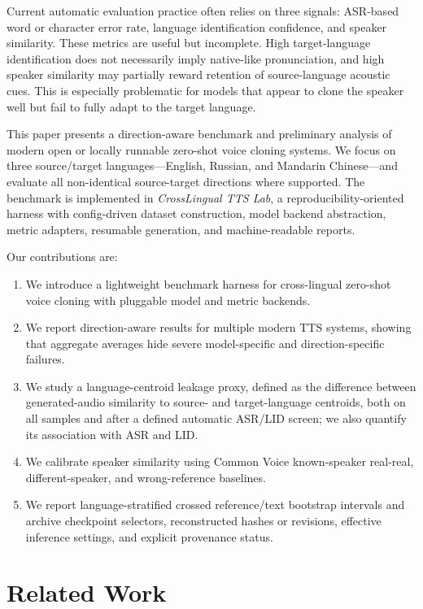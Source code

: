 \documentclass[11pt]{article}
\begin{document}
Current automatic evaluation practice often relies on three signals: ASR-based word or character error rate, language identification confidence, and speaker similarity. These metrics are useful but incomplete. High target-language identification does not necessarily imply native-like pronunciation, and high speaker similarity may partially reward retention of source-language acoustic cues. This is especially problematic for models that appear to clone the speaker well but fail to fully adapt to the target language.

This paper presents a direction-aware benchmark and preliminary analysis of modern open or locally runnable zero-shot voice cloning systems. We focus on three source/target languages---English, Russian, and Mandarin Chinese---and evaluate all non-identical source-target directions where supported. The benchmark is implemented in \textit{CrossLingual TTS Lab}, a reproducibility-oriented harness with config-driven dataset construction, model backend abstraction, metric adapters, resumable generation, and machine-readable reports.

Our contributions are:
\begin{enumerate}[leftmargin=1.5em]
    \item We introduce a lightweight benchmark harness for cross-lingual zero-shot voice cloning with pluggable model and metric backends.
    \item We report direction-aware results for multiple modern TTS systems, showing that aggregate averages hide severe model-specific and direction-specific failures.
    \item We study a language-centroid leakage proxy, defined as the difference between generated-audio similarity to source- and target-language centroids, both on all samples and after a defined automatic ASR/LID screen; we also quantify its association with ASR and LID.
    \item We calibrate speaker similarity using Common Voice known-speaker real-real, different-speaker, and wrong-reference baselines.
    \item We report language-stratified crossed reference/text bootstrap intervals and archive checkpoint selectors, reconstructed hashes or revisions, effective inference settings, and explicit provenance status.
\end{enumerate}

\section{Related Work}
\end{document}

